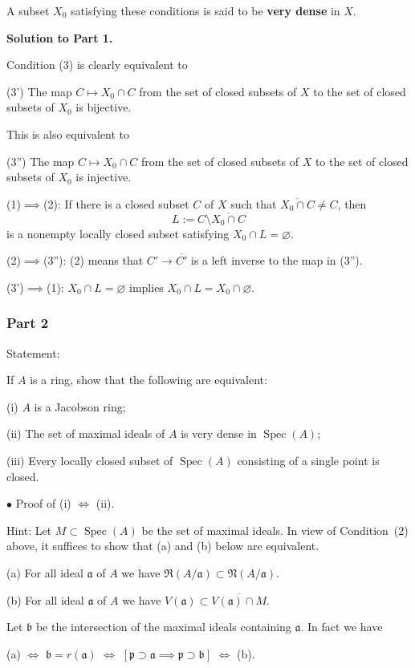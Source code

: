 \documentclass[parskip=half,fontsize=12pt]{scrartcl}%
\newcommand{\mf}{\mathfrak}
\newcommand{\aaa}{\mf a}
\newcommand{\bbb}{\mf b}
\newcommand{\ppp}{\mf p}
\newcommand{\bu}{\bullet}
\newcommand{\Spec}{\operatorname{Spec}}\newcommand{\Sp}{\operatorname{Spec}}
\begin{document}
A subset $X_0$ satisfying these conditions is said to be \textbf{very dense} in $X$. 

\textbf{Solution to Part 1.}

Condition (3) is clearly equivalent to 

(3') The map $C\mapsto X_0\cap C$ from the set of closed subsets of $X$ to the set of closed subsets of $X_0$ is bijective.

This is also equivalent to 

(3'') The map $C\mapsto X_0\cap C$ from the set of closed subsets of $X$ to the set of closed subsets of $X_0$ is injective.

(1)$\implies$(2): If there is a closed subset $C$ of $X$ such that $\overline{X_0\cap C}\ne C$, then 
$$
L:=C\setminus\overline{X_0\cap C}
$$ 
is  a nonempty locally closed subset satisfying $X_0\cap L=\varnothing$. 

(2)$\implies$(3''): (2) means that $C'\to\overline{C'}$ is a left inverse to the map in (3''). 

(3')$\implies$(1): $X_0\cap L=\varnothing$ implies $X_0\cap L=X_0\cap\varnothing$.

\subsubsection{Part 2} 

Statement: 

If $A$ is a ring, show that the following are equivalent:

(i) $A$ is a Jacobson ring;

(ii) The set of maximal ideals of $A$ is very dense in $\Spec(A)$;

(iii) Every locally closed subset of $\Spec(A)$ consisting of a single point is closed.

$\bu$ Proof of (i) $\iff$ (ii). 

Hint: Let $M\subset\Spec(A)$ be the set of maximal ideals. In view of Condition~(2) above, it suffices to show that (a) and (b) below are equivalent.

(a) For all ideal $\aaa$ of $A$ we have $\mf R(A/\aaa)\subset\mf N(A/\aaa)$.

(b) For all ideal $\aaa$ of $A$ we have $V(\aaa)\subset\overline{V(\aaa)\cap M}$.

Let $\bbb$ be the intersection of the maximal ideals containing $\aaa$. In fact we have 

\centerline{(a) $\iff$ $\bbb=r(\aaa)$ $\iff$ $[\ppp\supset\aaa\implies\ppp\supset\bbb]$ $\iff$ (b).}
\end{document}
